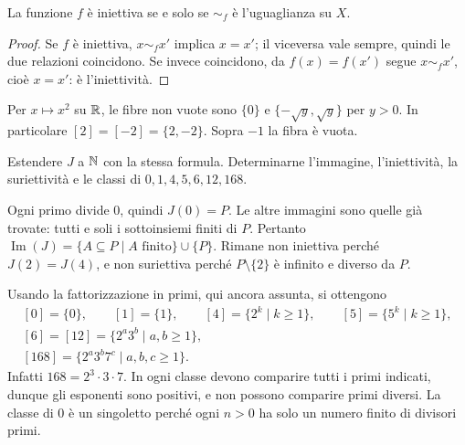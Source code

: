 \begin{schema}
\end{schema}

\begin{proposizione}
La funzione $f$ è iniettiva se e solo se $\sim_f$ è l'uguaglianza su $X$.
\end{proposizione}
\begin{proof}
Se $f$ è iniettiva, $x\sim_f x'$ implica $x=x'$; il viceversa vale sempre, quindi le due relazioni coincidono. Se invece coincidono, da $f(x)=f(x')$ segue $x\sim_f x'$, cioè $x=x'$: è l'iniettività.
\end{proof}

\begin{esempio}
Per $x\mapsto x^2$ su $\mathbb{R}$, le fibre non vuote sono $\{0\}$ e $\{-\sqrt y,\sqrt y\}$ per $y>0$. In particolare $[2]=[-2]=\{2,-2\}$. Sopra $-1$ la fibra è vuota.
\end{esempio}

\begin{esercizio}
Estendere $J$ a $\mathbb{N}$ con la stessa formula. Determinarne l'immagine, l'iniettività, la suriettività e le classi di $0,1,4,5,6,12,168$.
\end{esercizio}
\begin{svolgimento}
Ogni primo divide $0$, quindi $J(0)=P$. Le altre immagini sono quelle già trovate: tutti e soli i sottoinsiemi finiti di $P$. Pertanto $\operatorname{Im}(J)=\{A\subseteq P\mid A\text{ finito}\}\cup\{P\}$. Rimane non iniettiva perché $J(2)=J(4)$, e non suriettiva perché $P\setminus\{2\}$ è infinito e diverso da $P$.

Usando la fattorizzazione in primi, qui ancora assunta, si ottengono
\[
\begin{gathered}
[0]=\{0\},\qquad [1]=\{1\},\qquad [4]=\{2^k\mid k\ge1\},\qquad
[5]=\{5^k\mid k\ge1\},\\
[6]=[12]=\{2^a3^b\mid a,b\ge1\},\\
[168]=\{2^a3^b7^c\mid a,b,c\ge1\}.
\end{gathered}
\]
Infatti $168=2^3\cdot3\cdot7$. In ogni classe devono comparire tutti i primi indicati, dunque gli esponenti sono positivi, e non possono comparire primi diversi. La classe di $0$ è un singoletto perché ogni $n>0$ ha solo un numero finito di divisori primi.
\end{svolgimento}

